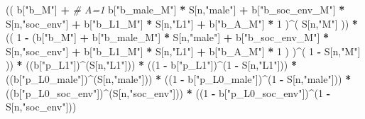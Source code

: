 \documentclass[
]{book}
\newenvironment{Shaded}{\begin{snugshade}}{\end{snugshade}}
\newcommand{\CommentTok}[1]{\textcolor[rgb]{0.56,0.35,0.01}{\textit{#1}}}
\newcommand{\DecValTok}[1]{\textcolor[rgb]{0.00,0.00,0.81}{#1}}
\newcommand{\NormalTok}[1]{#1}
\newcommand{\SpecialCharTok}[1]{\textcolor[rgb]{0.81,0.36,0.00}{\textbf{#1}}}
\newcommand{\StringTok}[1]{\textcolor[rgb]{0.31,0.60,0.02}{#1}}
\begin{document}
\begin{Shaded}
\begin{Highlighting}[]
\NormalTok{      (( b[}\StringTok{"b\_M"}\NormalTok{] }\SpecialCharTok{+}                                                             \CommentTok{\# A\textquotesingle{}=1}
\NormalTok{           b[}\StringTok{"b\_male\_M"}\NormalTok{] }\SpecialCharTok{*}\NormalTok{ S[n,}\StringTok{"male"}\NormalTok{] }\SpecialCharTok{+} 
\NormalTok{           b[}\StringTok{"b\_soc\_env\_M"}\NormalTok{] }\SpecialCharTok{*}\NormalTok{ S[n,}\StringTok{"soc\_env"}\NormalTok{] }\SpecialCharTok{+} 
\NormalTok{           b[}\StringTok{"b\_L1\_M"}\NormalTok{] }\SpecialCharTok{*}\NormalTok{ S[n,}\StringTok{"L1"}\NormalTok{] }\SpecialCharTok{+}
\NormalTok{           b[}\StringTok{"b\_A\_M"}\NormalTok{] }\SpecialCharTok{*} \DecValTok{1}\NormalTok{ )}\SpecialCharTok{\^{}}\NormalTok{( S[n,}\StringTok{"M"}\NormalTok{] )) }\SpecialCharTok{*}
\NormalTok{      (( }\DecValTok{1} \SpecialCharTok{{-}}\NormalTok{ (b[}\StringTok{"b\_M"}\NormalTok{] }\SpecialCharTok{+} 
\NormalTok{                b[}\StringTok{"b\_male\_M"}\NormalTok{] }\SpecialCharTok{*}\NormalTok{ S[n,}\StringTok{"male"}\NormalTok{] }\SpecialCharTok{+} 
\NormalTok{                b[}\StringTok{"b\_soc\_env\_M"}\NormalTok{] }\SpecialCharTok{*}\NormalTok{ S[n,}\StringTok{"soc\_env"}\NormalTok{] }\SpecialCharTok{+} 
\NormalTok{                b[}\StringTok{"b\_L1\_M"}\NormalTok{] }\SpecialCharTok{*}\NormalTok{ S[n,}\StringTok{"L1"}\NormalTok{] }\SpecialCharTok{+}
\NormalTok{                b[}\StringTok{"b\_A\_M"}\NormalTok{] }\SpecialCharTok{*} \DecValTok{1}\NormalTok{ ) )}\SpecialCharTok{\^{}}\NormalTok{( }\DecValTok{1} \SpecialCharTok{{-}}\NormalTok{ S[n,}\StringTok{"M"}\NormalTok{] )) }\SpecialCharTok{*}
\NormalTok{      ((b[}\StringTok{"p\_L1"}\NormalTok{])}\SpecialCharTok{\^{}}\NormalTok{(S[n,}\StringTok{"L1"}\NormalTok{])) }\SpecialCharTok{*}
\NormalTok{      ((}\DecValTok{1} \SpecialCharTok{{-}}\NormalTok{ b[}\StringTok{"p\_L1"}\NormalTok{])}\SpecialCharTok{\^{}}\NormalTok{(}\DecValTok{1} \SpecialCharTok{{-}}\NormalTok{ S[n,}\StringTok{"L1"}\NormalTok{])) }\SpecialCharTok{*}
\NormalTok{      ((b[}\StringTok{"p\_L0\_male"}\NormalTok{])}\SpecialCharTok{\^{}}\NormalTok{(S[n,}\StringTok{"male"}\NormalTok{])) }\SpecialCharTok{*} 
\NormalTok{      ((}\DecValTok{1} \SpecialCharTok{{-}}\NormalTok{ b[}\StringTok{"p\_L0\_male"}\NormalTok{])}\SpecialCharTok{\^{}}\NormalTok{(}\DecValTok{1} \SpecialCharTok{{-}}\NormalTok{ S[n,}\StringTok{"male"}\NormalTok{])) }\SpecialCharTok{*} 
\NormalTok{      ((b[}\StringTok{"p\_L0\_soc\_env"}\NormalTok{])}\SpecialCharTok{\^{}}\NormalTok{(S[n,}\StringTok{"soc\_env"}\NormalTok{])) }\SpecialCharTok{*}
\NormalTok{      ((}\DecValTok{1} \SpecialCharTok{{-}}\NormalTok{ b[}\StringTok{"p\_L0\_soc\_env"}\NormalTok{])}\SpecialCharTok{\^{}}\NormalTok{(}\DecValTok{1} \SpecialCharTok{{-}}\NormalTok{ S[n,}\StringTok{"soc\_env"}\NormalTok{])) }
    

\end{Highlighting}
\end{Shaded}
\end{document}
